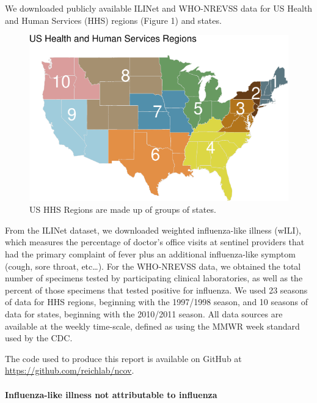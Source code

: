 \documentclass[]{article}
\let\oldparagraph\paragraph
\renewcommand{\paragraph}[1]{\oldparagraph{#1}\mbox{}}
\begin{document}
We downloaded publicly available ILINet and WHO-NREVSS data for US
Health and Human Services (HHS) regions (Figure 1) and states.

\begin{figure}
\centering
\includegraphics{ili-labtest-report_files/figure-latex/hhs-regions-map-1.pdf}
\caption{\label{fig:hhs-regions-map}US HHS Regions are made up of groups
of states.}
\end{figure}

From the ILINet dataset, we downloaded weighted influenza-like illness
(wILI), which measures the percentage of doctor's office visits at
sentinel providers that had the primary complaint of fever plus an
additional influenza-like symptom (cough, sore throat, etc\ldots{}). For
the WHO-NREVSS data, we obtained the total number of specimens tested by
participating clinical laboratories, as well as the percent of those
specimens that tested positive for influenza. We used 23 seasons of data
for HHS regions, beginning with the 1997/1998 season, and 10 seasons of
data for states, beginning with the 2010/2011 season. All data sources
are available at the weekly time-scale, defined as using the MMWR week
standard used by the CDC.

The code used to produce this report is available on GitHub at
\url{https://github.com/reichlab/ncov}.

\hypertarget{influenza-like-illness-not-attributable-to-influenza}{%
\paragraph{Influenza-like illness not attributable to
influenza}\label{influenza-like-illness-not-attributable-to-influenza}}
\end{document}
